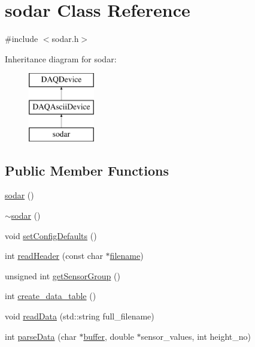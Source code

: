 \hypertarget{classsodar}{\section{sodar Class Reference}
\label{classsodar}
}


{\ttfamily \#include $<$sodar.\-h$>$}

Inheritance diagram for sodar\-:\begin{figure}[H]
\begin{center}
\leavevmode
\includegraphics[height=3.000000cm]{classsodar}
\end{center}
\end{figure}
\subsection*{Public Member Functions}
\begin{DoxyCompactItemize}
\item 
\hyperlink{classsodar_a8aaddca894ce6fe0f8ce57c1f4a64f85}{sodar} ()
\item 
\hyperlink{classsodar_aa4e1b67dd45bd581be158676ebf9a080}{$\sim$sodar} ()
\item 
void \hyperlink{classsodar_a77ca325c97b3884426c1946b9882d948}{set\-Config\-Defaults} ()
\item 
int \hyperlink{classsodar_ad9fd2ae78c8e8319033e34e8a85a5657}{read\-Header} (const char $\ast$\hyperlink{classDAQDevice_a7f9cda7cf5b41f6b134c313477e9644b}{filename})
\item 
unsigned int \hyperlink{classsodar_a378a75de0ce9f12a434b0141910a8cb8}{get\-Sensor\-Group} ()
\item 
int \hyperlink{classsodar_afcdf95cbd5488e8a68d15d0817b62ba6}{create\-\_\-data\-\_\-table} ()
\item 
void \hyperlink{classsodar_ae760bb4e2c93e93dba5cd5ae25914918}{read\-Data} (std\-::string full\-\_\-filename)
\item 
int \hyperlink{classsodar_a827706bc079f28fbdf0f7e735412ba09}{parse\-Data} (char $\ast$\hyperlink{classDAQDevice_ab661aa5c5b4bafe78354f5169b1c7d2f}{buffer}, double $\ast$sensor\-\_\-values, int height\-\_\-no)
\end{DoxyCompactItemize}
